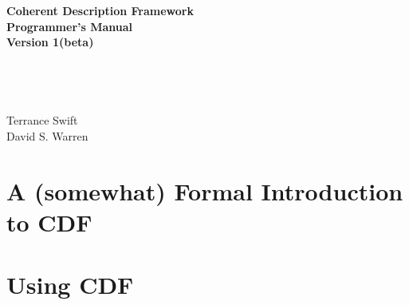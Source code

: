 \documentclass[11pt]{report}
\newcommand{\version}{Version 1(beta)}
\begin{document}
\begin{center}
{\Huge
{\bf Coherent Description Framework \\ Programmer's Manual \\ \version }
\ \\ \ \\ }
{\Large
\ \\ \ \\ \ \\
Terrance Swift \\ David S. Warren
}
\end{center}

\date{}

\newpage
\thispagestyle{empty}



\thispagestyle{empty}

\newpage
\thispagestyle{empty}
\tableofcontents
\newpage        %
  



\part{A (somewhat) Formal Introduction to CDF} \label{part:semantics}


  
  


\part{Using CDF}


%
%

%

%



%

\printindex
\end{document}
